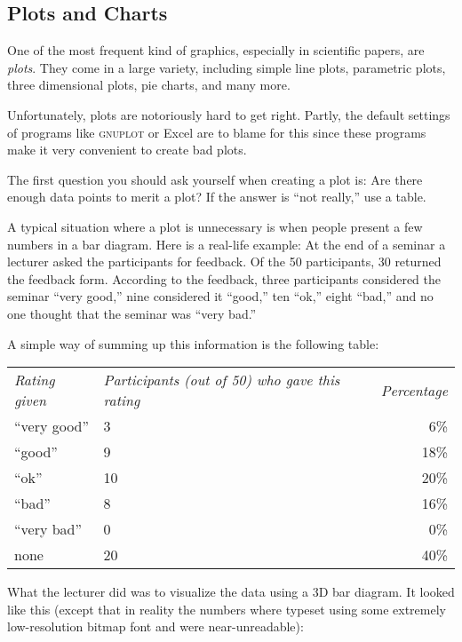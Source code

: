 \subsection{Plots and Charts}

One of the most frequent kind of graphics, especially in scientific
papers, are \emph{plots}. They come in a large variety, including
simple line plots, parametric plots, three dimensional plots, pie
charts, and many more.

Unfortunately, plots are notoriously hard to get right. Partly, the
default settings of programs like \textsc{gnuplot} or Excel are to
blame for this since these programs make it very convenient to create
bad plots.

The first question you should ask yourself when creating a plot is:
Are there enough data points to merit a plot? If the answer is ``not
really,'' use a table.

A typical situation where a plot is unnecessary is when people present
a few numbers in a bar diagram. Here is a real-life example: At the
end of a seminar a lecturer asked the participants for feedback. Of
the 50 participants, 30 returned the feedback form. According to the
feedback, three participants considered the seminar ``very good,''
nine considered it  ``good,'' ten ``ok,'' eight ``bad,'' and no one thought
that the seminar was ``very bad.''

A simple way of summing up this information is the following table:

\medskip
\begin{tabular}{lp{3.75cm}r}
  \emph{Rating given} & \raggedright\emph{Participants (out of 50) who gave this rating} &
  \emph{Percentage} \\[1.75em]
  ``very good'' & \hfil\hphantom{0}3\hfil & \hphantom{0}6\% \\
  ``good'' & \hfil\hphantom{0}9\hfil & 18\% \\
  ``ok'' & \hfil10\hfil & 20\% \\
  ``bad'' & \hfil\hphantom{0}8\hfil & 16\% \\
  ``very bad'' & \hfil\hphantom{0}0\hfil & \hphantom{0}0\% \\[2mm]
  none & \hfil20\hfil & 40\% \\
\end{tabular}

\bigskip
What the lecturer did was to visualize the data using a 3D bar
diagram. It looked like this (except that in reality the numbers
where typeset using some extremely low-resolution bitmap font and
were near-unreadable):

